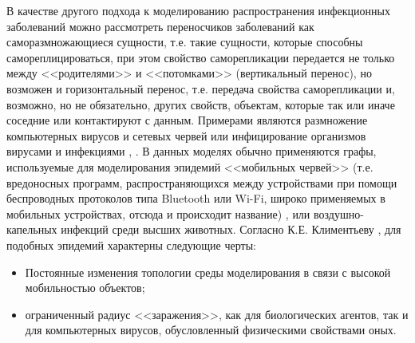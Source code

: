 	В качестве другого подхода к моделированию распространения инфекционных заболеваний можно рассмотреть переносчиков заболеваний как  саморазмножающиеся сущности, т.е. такие сущности, которые способны самореплицироваться, при этом свойство  саморепликации передается не только между <<родителями>> и <<потомками>> (вертикальный перенос), но возможен и горизонтальный перенос, т.е. передача свойства саморепликации и, возможно, но не обязательно, других свойств, объектам, которые так или иначе соседние или контактируют с данным.  Примерами являются размножение компьютерных вирусов и сетевых червей  %
	\cite{Bratus:2010}
 или инфицирование организмов вирусами и инфекциями %
 \cite{Klimentiev:2013}, \cite[с. 133]{Smith:Zombies}
. 
В данных моделях обычно применяются графы, используемые для моделирования эпидемий <<мобильных червей>> (т.е. вредоносных программ, распространяющихся между устройствами при помощи беспроводных протоколов типа Bluetooth или Wi-Fi, широко применяемых в мобильных устройствах, отсюда и происходит название) %
\cite{Klimentiev:2016}, \cite[с. 27]{Klimentiev:2013}
или воздушно-капельных инфекций среди высших  животных.   %
Согласно К.Е. Климентьеву %
\cite{Klimentiev:2015}, для подобных эпидемий характерны следующие черты:
\begin{itemize}
	\item Постоянные изменения топологии среды моделирования в связи с высокой мобильностью  объектов;
	\item ограниченный радиус <<заражения>>, как для биологических агентов, так и для компьютерных вирусов, обусловленный физическими свойствами оных.
\end{itemize}



